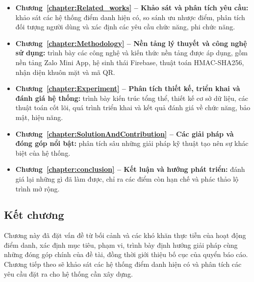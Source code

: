 \documentclass[../main.tex]{subfiles}
\begin{document}
\begin{itemize}[leftmargin=1.5em]
  \item \textbf{Chương~\ref{chapter:Related_works} -- Khảo sát và phân tích yêu cầu:}
  khảo sát các hệ thống điểm danh hiện có, so sánh ưu nhược điểm, phân tích đối tượng
  người dùng và xác định các yêu cầu chức năng, phi chức năng.

  \item \textbf{Chương~\ref{chapter:Methodology} -- Nền tảng lý thuyết và công nghệ sử
  dụng:} trình bày các công nghệ và kiến thức nền tảng được áp dụng, gồm nền tảng Zalo
  Mini App, hệ sinh thái Firebase, thuật toán HMAC-SHA256, nhận diện khuôn mặt và mã QR.

  \item \textbf{Chương~\ref{chapter:Experiment} -- Phân tích thiết kế, triển khai và
  đánh giá hệ thống:} trình bày kiến trúc tổng thể, thiết kế cơ sở dữ liệu, các thuật
  toán cốt lõi, quá trình triển khai và kết quả đánh giá về chức năng, bảo mật, hiệu năng.

  \item \textbf{Chương~\ref{chapter:SolutionAndContribution} -- Các giải pháp và đóng
  góp nổi bật:} phân tích sâu những giải pháp kỹ thuật tạo nên sự khác biệt của hệ thống.

  \item \textbf{Chương~\ref{chapter:conclusion} -- Kết luận và hướng phát triển:} đánh
  giá lại những gì đã làm được, chỉ ra các điểm còn hạn chế và phác thảo lộ trình mở rộng.
\end{itemize}

\subsection*{Kết chương}
Chương này đã đặt vấn đề từ bối cảnh và các khó khăn thực tiễn của hoạt động điểm danh, xác
định mục tiêu, phạm vi, trình bày định hướng giải pháp cùng những đóng góp chính của đề tài,
đồng thời giới thiệu bố cục của quyển báo cáo. Chương tiếp theo sẽ khảo sát các hệ thống điểm
danh hiện có và phân tích các yêu cầu đặt ra cho hệ thống cần xây dựng.
\end{document}
